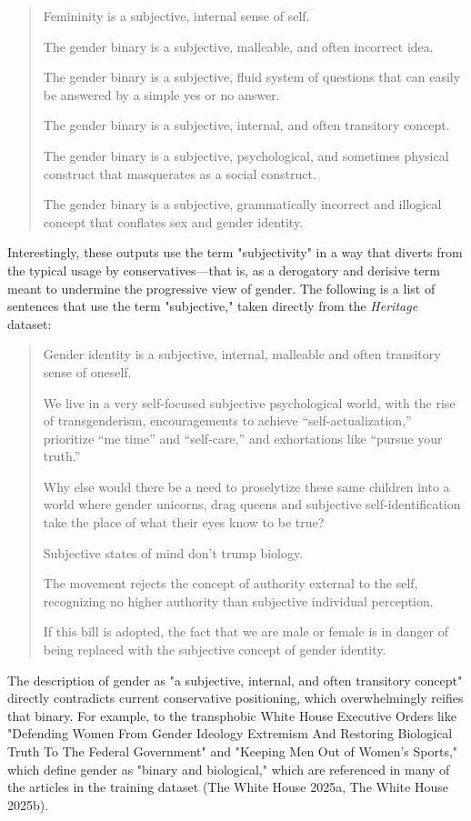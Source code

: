 \documentclass[11pt]{article}
\begin{document}
\begin{enumerate}
\begin{quote}
Femininity is a subjective, internal sense of self.

The gender binary is a subjective, malleable, and often incorrect
idea.

The gender binary is a subjective, fluid system of questions that
can easily be answered by a simple yes or no answer.

The gender binary is a subjective, internal, and often transitory
concept.

The gender binary is a subjective, psychological, and sometimes
physical construct that masquerates as a social construct.

The gender binary is a subjective, grammatically incorrect and
illogical concept that conflates sex and gender identity. 
\end{quote}
Interestingly, these outputs use the term "subjectivity" in a way that
diverts from the typical usage by conservatives---that is, as a
derogatory and derisive term meant to undermine the progressive view
of gender. The following is a list of sentences that use the term
"subjective," taken directly from the \emph{Heritage} dataset:
\begin{quote}
Gender identity is a subjective, internal, malleable and often
transitory sense of oneself.

We live in a very self-focused subjective psychological world, with
the rise of transgenderism, encouragements to achieve
“self-actualization,” prioritize “me time” and “self-care,” and
exhortations like “pursue your truth.”

Why else would there be a need to proselytize these same children into
a world where gender unicorns, drag queens and subjective
self-identification take the place of what their eyes know to be true?

Subjective states of mind don’t trump biology.

The movement rejects the concept of authority external to the self,
recognizing no higher authority than subjective individual perception.

If this bill is adopted, the fact that we are male or female is in
danger of being replaced with the subjective concept of gender
identity.
\end{quote}
The description of gender as "a subjective, internal, and often
transitory concept" directly contradicts current conservative
positioning, which overwhelmingly reifies that binary. For example, to
the transphobic White House Executive Orders like "Defending Women
From Gender Ideology Extremism And Restoring Biological Truth To The
Federal Government" and "Keeping Men Out of Women's Sports," which
define gender as "binary and biological," which are referenced in many
of the articles in the training dataset (The White House 2025a, The
White House 2025b).


\end{enumerate}
\end{document}
